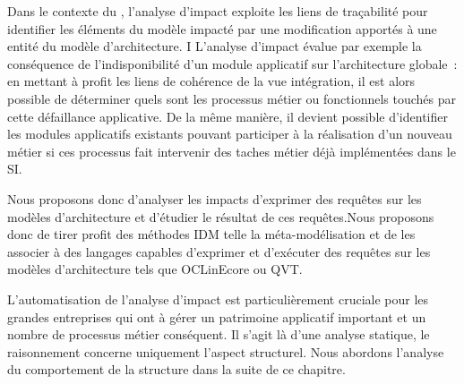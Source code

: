 Dans le contexte du , l'analyse d'impact exploite les
liens de traçabilité pour identifier les éléments du modèle impacté par une modification 
apportés à une entité du modèle d'architecture. I
L'analyse d'impact évalue par exemple la conséquence de l'indisponibilité d'un module applicatif sur l'architecture
globale~: en mettant à profit les liens de cohérence de la vue intégration, il
est alors possible de déterminer quels sont les processus métier ou
fonctionnels touchés par cette défaillance applicative. De la même manière, il devient
possible d'identifier les modules applicatifs existants pouvant participer à la
réalisation d'un nouveau métier si ces processus fait intervenir des taches
métier déjà implémentées dans le SI.

Nous proposons donc d'analyser les impacts d'exprimer des requêtes sur les modèles
d'architecture et d'étudier le résultat de ces requêtes.Nous proposons
donc de tirer profit des méthodes IDM telle la méta-modélisation et de les
associer à des langages capables d'exprimer et d'exécuter des requêtes sur les modèles d'architecture
tels que OCLinEcore ou QVT.


L'automatisation de l'analyse d'impact est particulièrement cruciale pour les grandes entreprises qui ont à gérer
un patrimoine applicatif important et un nombre de processus métier conséquent.
Il s'agit là d'une analyse statique, le raisonnement concerne uniquement l'aspect structurel. Nous abordons l'analyse
du comportement de la structure dans la suite de ce chapitre.









